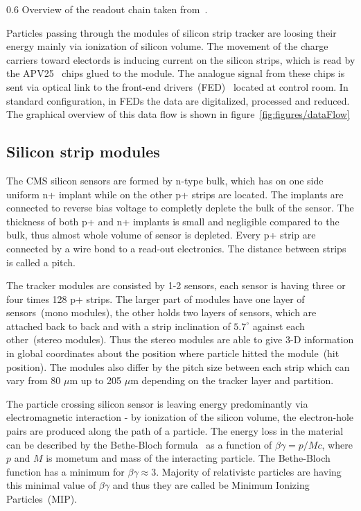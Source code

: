                  {0.6}       %
                 {Overview of the readout chain taken from~\cite{Bainbridge:2004jc}.} %

Particles passing through the modules of silicon strip tracker are loosing their energy mainly via ionization of silicon volume. The movement of the charge carriers toward electords is inducing current on the silicon strips, which is read by the APV25~\cite{French:2001xb} chips glued to the module. The analogue signal from these chips is sent via optical link to the front-end drivers~(FED)~\cite{Baird:2002wg} located at control room. In standard configuration, in FEDs the data are digitalized, processed and reduced. The graphical overview of this data flow is shown in figure~\ref{fig:figures/dataFlow}

\subsection{Silicon strip modules}

The CMS silicon sensors are formed by n-type bulk, which has on one side uniform n+ implant while on the other p+ strips are located. The implants are connected to reverse bias voltage to completly deplete the bulk of the sensor. The thickness of both p+ and n+ implants is small and negligible compared to the bulk, thus almost whole volume of sensor is depleted. Every p+ strip are connected by a wire bond to a read-out electronics. The distance between strips is called a pitch.

The tracker modules are consisted by 1-2 sensors, each sensor is having three or four times 128 p+ strips. The larger part of modules have one layer of sensors~(mono modules), the other holds two layers of sensors, which are attached back to back and with a strip inclination of $5.7^{\circ}$ against each other~(stereo modules). Thus the stereo modules are able to give 3-D information in global coordinates about the position where particle hitted the module~(hit position). The modules also differ by the pitch size between each strip which can vary from 80 $\mu$m up to 205 $\mu$m depending on the tracker layer and partition.

The particle crossing silicon sensor is leaving energy predominantly via electromagnetic interaction - by ionization of the silicon volume, the electron-hole pairs are produced along the path of a particle. The energy loss in the material can be described by the Bethe-Bloch formula~\cite{Groom:2000sm} as a function of $\beta\gamma = p/Mc$, where $p$ and $M$ is mometum and mass of the interacting particle. The Bethe-Bloch function has a minimum for $\beta\gamma \approx 3$. Majority of relativistc particles are having this minimal value of $\beta\gamma$ and thus they are called be Minimum Ionizing Particles~(MIP).


